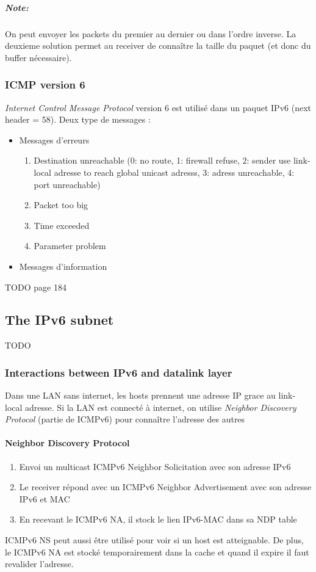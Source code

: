 \subparagraph{Note:} On peut envoyer les packets du premier au dernier ou dans l'ordre inverse.
La deuxieme solution permet au receiver de connaître la taille du paquet (et donc du buffer
nécessaire).

\subsubsection{ICMP version 6}
\textit{Internet Control Message Protocol} version 6 est utilisé dans un paquet IPv6
(next header = 58). Deux type de messages :

\begin{itemize}
    \item Messages d'erreurs
        \begin{enumerate}
            \item Destination unreachable (0: no route, 1: firewall refuse, 2: sender use link-local adresse to reach global unicast adresss, 3: adress unreachable, 4: port unreachable)
            \item Packet too big
            \item Time exceeded
            \item Parameter problem
        \end{enumerate}
    \item Messages d'information
\end{itemize}
TODO page 184

\subsection{The IPv6 subnet}
TODO

\subsubsection{Interactions between IPv6 and datalink layer}

Dans une LAN sans internet, les hosts prennent une adresse IP grace au link-local adresse.
Si la LAN est connecté à internet, on utilise \textit{Neighbor Discovery Protocol} (partie de ICMPv6) pour connaître l'adresse des autres

\paragraph{Neighbor Discovery Protocol}

\begin{enumerate}
    \item Envoi un multicast ICMPv6 Neighbor Solicitation avec son adresse IPv6
    \item Le receiver répond avec un ICMPv6 Neighbor Advertisement avec son adresse IPv6 et MAC
    \item En recevant le ICMPv6 NA, il stock le lien IPv6-MAC dans sa NDP table
\end{enumerate}
ICMPv6 NS peut aussi être utilisé pour voir si un host est atteignable. De plus, le ICMPv6 NA est
stocké temporairement dans la cache et quand il expire il faut revalider l'adresse.

